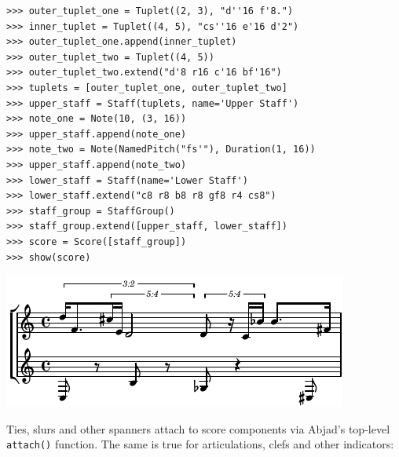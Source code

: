 \documentclass{article}
\begin{document}

\begin{lstlisting}
>>> outer_tuplet_one = Tuplet((2, 3), "d''16 f'8.")
>>> inner_tuplet = Tuplet((4, 5), "cs''16 e'16 d'2")
>>> outer_tuplet_one.append(inner_tuplet)
>>> outer_tuplet_two = Tuplet((4, 5))
>>> outer_tuplet_two.extend("d'8 r16 c'16 bf'16")
>>> tuplets = [outer_tuplet_one, outer_tuplet_two]
>>> upper_staff = Staff(tuplets, name='Upper Staff')
>>> note_one = Note(10, (3, 16))
>>> upper_staff.append(note_one)
>>> note_two = Note(NamedPitch("fs'"), Duration(1, 16))
>>> upper_staff.append(note_two)
>>> lower_staff = Staff(name='Lower Staff')
>>> lower_staff.extend("c8 r8 b8 r8 gf8 r4 cs8")
>>> staff_group = StaffGroup()
>>> staff_group.extend([upper_staff, lower_staff])
>>> score = Score([staff_group])
>>> show(score)
\end{lstlisting}
\includegraphics{assets/lilypond-45865c9ff19c72c1c9f7a6f4234e8546.pdf}

\noindent Ties, slurs and other spanners attach to score components via Abjad's
top-level \texttt{attach()} function. The same is true for articulations, clefs
and other indicators:

\end{document}
